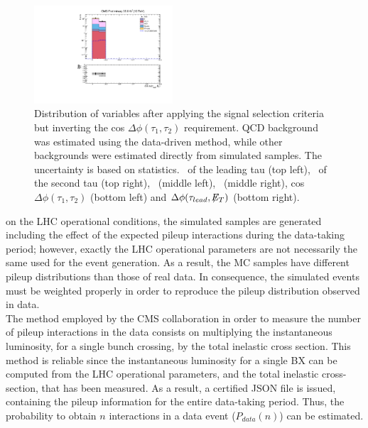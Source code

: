 \begin{figure}[H]
\begin{center}
 \includegraphics[clip,width=0.46\textwidth]{figuras/Chapter5/Plots_CosDphiInv/cosDphiTauMET.pdf} \hfill
 \end{center}
 \caption{Distribution of variables after applying the signal selection criteria but inverting
 the cos $\Delta \phi (\tau_{1},\tau_{2})$ requirement. QCD background was estimated 
 using the data-driven method, while other backgrounds were estimated  directly 
 from simulated samples. The uncertainty is based on statistics. \pt~of the leading tau (top left),
 \pt~of the second tau (top right), \MET~(middle left), \mass~(middle right), 
 cos $\Delta \phi (\tau_{1},\tau_{2})$ (bottom left) and $\Delta \phi (\tau_{lead}, \not\!\!E_T)$ (bottom right).}
\label{fig:cosDphiInv}
 \end{figure}

\noindent on the LHC operational conditions, the simulated 
samples are generated including the effect of the expected 
pileup interactions during the data-taking period; however, exactly 
the LHC operational parameters are not necessarily the same 
used for the event generation. As a result, the MC samples 
have different pileup distributions than those of real 
data. In consequence, the simulated events must be 
weighted properly in order to reproduce the pileup distribution
observed in data. \\

\noindent The method employed by the CMS collaboration in order to measure 
the number of pileup interactions in the data consists on multiplying 
the instantaneous luminosity, for a single bunch crossing,
by the total inelastic cross section. This method is reliable
since the instantaneous luminosity for a single BX can be computed
from the LHC operational parameters, and the total inelastic 
cross-section, that has been measured. As a result, a certified JSON file 
is issued, containing the pileup information for the 
entire data-taking period. Thus, the probability to 
obtain $n$ interactions in a data event ($P_{data}(n)$) can be estimated. \\

